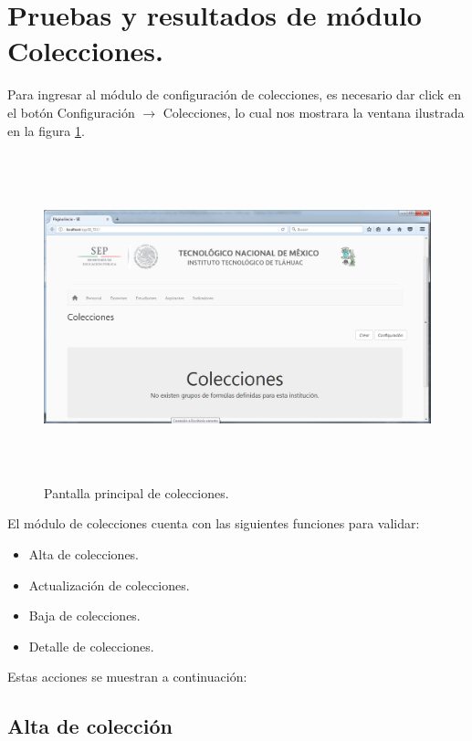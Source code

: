 		\section{Pruebas y resultados de m\'odulo Colecciones.}

			Para ingresar al m\'odulo de configuraci\'on de colecciones, es necesario dar click en el bot\'on Configuraci\'on $\rightarrow$ Colecciones, lo cual nos mostrara la ventana ilustrada en la figura \ref{fig_Colecciones}.\\


			\begin{figure}[]
		        \centering
		        \includegraphics[width=16cm, height=9.5cm]{figuras/Colecciones}
		        \caption{Pantalla principal de colecciones.}
		        \label{fig_Colecciones}
		    \end{figure}
			
			El m\'odulo de colecciones cuenta con las siguientes funciones para validar:
			\begin{itemize}
				\item Alta de colecciones.
				\item Actualizaci\'on de colecciones.
				\item Baja de colecciones.
				\item Detalle de colecciones.
			\end{itemize}

			Estas acciones se muestran a continuaci\'on:

			\subsection{Alta de colecci\'on}

